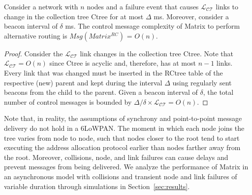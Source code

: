 \begin{theorem} Consider a network with $n$ nodes and a failure event that causes $\mathcal{L_{CT}}$ links to change in the collection tree Ctree for at most $\Delta$ ms. Moreover, consider a beacon interval of $\delta$ ms.
The control message complexity of Matrix to perform alternative routing is $Msg(Matrix^{RC})$ = $O(n)$. 
\end{theorem}

\begin{proof}
Consider the $\mathcal{L_{CT}}$ link changes in the collection tree Ctree. Note that $\mathcal{L_{CT}} = O(n)$ since Ctree is acyclic and, therefore, has at most $n-1$ links. Every link that was changed must be inserted in the RCtree table of the respective (new) parent and kept during the interval $\Delta$ using regularly sent beacons from the child to the parent. Given a beacon interval of $\delta$, the total number of control messages is bounded by ${\Delta}/{\delta} \times \mathcal{L_{CT}} = O(n)$.\end{proof}

Note that, in reality, the assumptions of synchrony and point-to-point message delivery do not hold in a 6LoWPAN. The moment in which each node joins the tree varies from node to node, such that nodes closer to the root tend to start executing the address allocation protocol earlier than nodes farther away from the root. Moreover, collisions, node, and link failures can cause delays and prevent messages from being delivered. We analyze the performance of Matrix in an asynchronous model with collisions and transient node and link failures of variable duration through simulations in Section~\ref{sec:results}.
